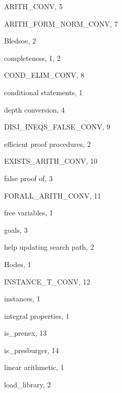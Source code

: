\begin{theindex}

  \item {\ptt ARITH\_CONV}, 5
  \item {\ptt ARITH\_FORM\_NORM\_CONV}, 7

  \indexspace

  \item Bledsoe, 2

  \indexspace

  \item completeness, 1, 2
  \item {\ptt COND\_ELIM\_CONV}, 8
  \item conditional statements, 1

  \indexspace

  \item depth conversion, 4
  \item {\ptt DISJ\_INEQS\_FALSE\_CONV}, 9

  \indexspace

  \item efficient proof procedures, 2
  \item {\ptt EXISTS\_ARITH\_CONV}, 10

  \indexspace

  \item false
    \subitem proof of, 3
  \item {\ptt FORALL\_ARITH\_CONV}, 11
  \item free variables, 1

  \indexspace

  \item goals, 3

  \indexspace

  \item help
    \subitem updating search path, 2
  \item Hodes, 1

  \indexspace

  \item {\ptt INSTANCE\_T\_CONV}, 12
  \item instances, 1
  \item integral properties, 1
  \item {\ptt is\_prenex}, 13
  \item {\ptt is\_presburger}, 14

  \indexspace

  \item linear arithmetic, 1
  \item {\ptt load\_library}, 2


\end{theindex}
